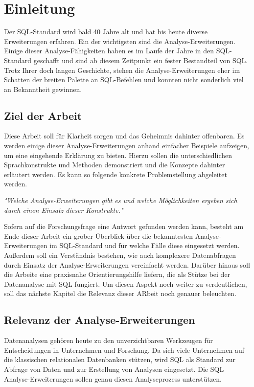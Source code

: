 \chapter{Einleitung}
\label{chap:einleitung} Der SQL-Standard wird bald 40 Jahre alt und hat bis heute
diverse Erweiterungen erfahren. Ein der wichtigsten sind die Analyse-Erweiterungen.
Einige dieser Analyse-Fähigkeiten haben es im Laufe der Jahre in den SQL-Standard
geschafft und sind ab diesem Zeitpunkt ein fester Bestandteil von SQL. Trotz
Ihrer doch langen Geschichte, stehen die Analyse-Erweiterungen eher im Schatten der
breiten Palette an SQL-Befehlen und konnten nicht sonderlich viel an Bekanntheit
gewinnen.

\section{Ziel der Arbeit}
\label{sec:ziel_der_arbeit} Diese Arbeit soll für Klarheit sorgen und das Geheimnis
dahinter offenbaren. Es werden einige dieser Analyse-Erweiterungen anhand
einfacher Beispiele aufzeigen, um eine eingehende Erklärung zu bieten. Hierzu
sollen die unterschiedlichen Sprachkonstrukte und Methoden demonstriert und die
Konzepte dahinter erläutert werden. Es kann so folgende konkrete Problemstellung
abgeleitet werden.
\begin{center}
	\textit{"Welche Analyse-Erweiterungen gibt es und welche Möglichkeiten ergeben
	sich durch einen Einsatz dieser Konstrukte."}
\end{center}
Sofern auf die Forschungsfrage eine Antwort gefunden werden kann, besteht am Ende
dieser Arbeit ein grober Überblick über die bekanntesten Analyse-Erweiterungen im
SQL-Standard und für welche Fälle diese eingesetzt werden. Außerdem soll ein
Verständnis bestehen, wie auch komplexere Datenabfragen durch Einsatz der Analyse-Erweiterungen
vereinfacht werden. Darüber hinaus soll die Arbeite eine praxisnahe
Orientierungshilfe liefern, die als Stütze bei der Datenanalyse mit SQL fungiert.
Um diesen Aspekt noch weiter zu verdeutlichen, soll das nächste Kapitel die Relevanz
dieser ARbeit noch genauer beleuchten.

\section{Relevanz der Analyse-Erweiterungen}
\label{sec:relevant} Datenanalysen gehören heute zu den unverzichtbaren Werkzeugen
für Entscheidungen in Unternehmen und Forschung. Da sich viele Unternehmen auf
die klassischen relationalen Datenbanken stützen, wird SQL als Standard zur Abfrage
von Daten und zur Erstellung von Analysen eingesetzt. Die SQL Analyse-Erweiterungen
sollen genau diesen Analyseprozess unterstützen.

